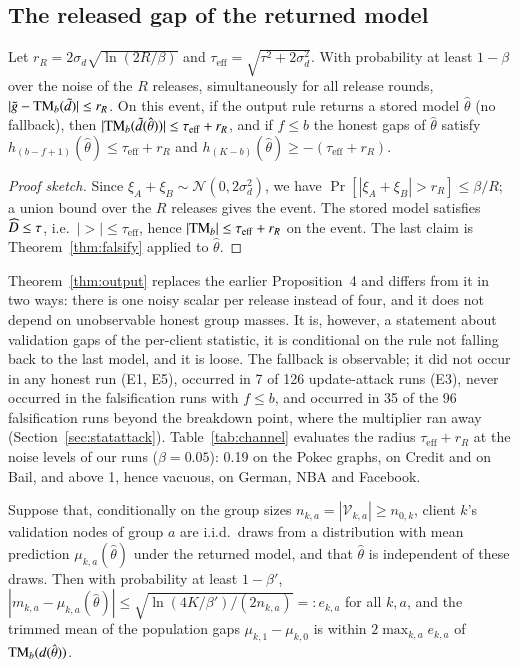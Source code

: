 \subsection{The released gap of the returned model}

\begin{theorem}\label{thm:output}
Let $r_R=2\sigma_d\sqrt{\ln(2R/\beta)}$ and $\tau_{\mathrm{eff}}=\sqrt{\tau^2+2\sigma_d^2}$. With probability at least $1-\beta$ over the noise of the $R$ releases, simultaneously for all release rounds, $|\tilde g-\mathrm{TM}_b(\tilde d)|\le r_R$. On this event, if the output rule returns a stored model $\hat\theta$ (no fallback), then $|\mathrm{TM}_b(\tilde d(\hat\theta))|\le\tau_{\mathrm{eff}}+r_R$, and if $f\le b$ the honest gaps of $\hat\theta$ satisfy $h_{(b-f+1)}(\hat\theta)\le\tau_{\mathrm{eff}}+r_R$ and $h_{(K-b)}(\hat\theta)\ge-(\tau_{\mathrm{eff}}+r_R)$.
\end{theorem}

\begin{proof}[Proof sketch]
Since $\xi_A+\xi_B\sim\mathcal{N}(0,2\sigma_d^2)$, we have $\Pr[|\xi_A+\xi_B|>r_R]\le\beta/R$; a union bound over the $R$ releases gives the event. The stored model satisfies $\widehat{D}\le\tau$, i.e.\ $|\gt|\le\tau_{\mathrm{eff}}$, hence $|\mathrm{TM}_b|\le\tau_{\mathrm{eff}}+r_R$ on the event. The last claim is Theorem~\ref{thm:falsify} applied to $\hat\theta$.
\end{proof}

Theorem~\ref{thm:output} replaces the earlier Proposition~4 and differs from it in two ways: there is one noisy scalar per release instead of four, and it does not depend on unobservable honest group masses. It is, however, a statement about validation gaps of the per-client statistic, it is conditional on the rule not falling back to the last model, and it is loose. The fallback is observable; it did not occur in any honest run (E1, E5), occurred in 7 of 126 update-attack runs (E3), never occurred in the falsification runs with $f\le b$, and occurred in 35 of the 96 falsification runs beyond the breakdown point, where the multiplier ran away (Section~\ref{sec:statattack}). Table~\ref{tab:channel} evaluates the radius $\tau_{\mathrm{eff}}+r_R$ at the noise levels of our runs ($\beta=0.05$): 0.19 on the Pokec graphs, \radCredit{} on Credit and \radBail{} on Bail, and above 1, hence vacuous, on German, NBA and Facebook.

\begin{proposition}\label{prop:pop}
Suppose that, conditionally on the group sizes $n_{k,a}=|\mathcal{V}_{k,a}|\ge n_{0,k}$, client $k$'s validation nodes of group $a$ are i.i.d.\ draws from a distribution with mean prediction $\mu_{k,a}(\hat\theta)$ under the returned model, and that $\hat\theta$ is independent of these draws. Then with probability at least $1-\beta'$, $|m_{k,a}-\mu_{k,a}(\hat\theta)|\le\sqrt{\ln(4K/\beta')/(2n_{k,a})}=:e_{k,a}$ for all $k,a$, and the trimmed mean of the population gaps $\mu_{k,1}-\mu_{k,0}$ is within $2\max_{k,a}e_{k,a}$ of $\mathrm{TM}_b(d(\hat\theta))$.
\end{proposition}

